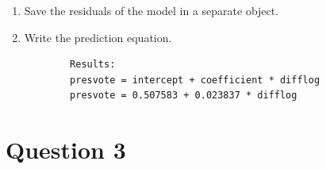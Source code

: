 \documentclass[12pt,letterpaper]{article}
\begin{document}
\begin{enumerate}
		\item Save the residuals of the model in a separate object.
		
		  
		
		\item Write the prediction equation.
		
		\begin{verbatim} 
		Results: 
		presvote = intercept + coefficient * difflog
		presvote = 0.507583 + 0.023837 * difflog
		\end{verbatim}
		
	\end{enumerate}
	
	\newpage	
\section*{Question 3}
\end{document}
